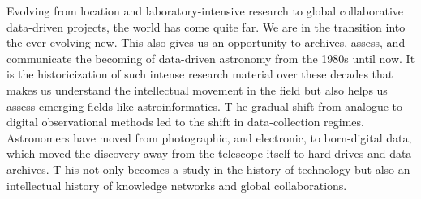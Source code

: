 Evolving from location and laboratory-intensive research to global collaborative data-driven projects, the world has come quite far.  We are in the transition into the ever-evolving new. This also gives us an opportunity to archives, assess, and communicate the becoming of data-driven astronomy from the 1980s until now. It is the historicization of such intense research material over these decades that makes us understand the intellectual movement in the field but also helps us assess emerging fields like astroinformatics.  T
he gradual shift from analogue to digital observational methods led to the shift in data-collection regimes.
Astronomers have moved from photographic, and electronic, to born-digital data, which moved the discovery away from the telescope itself to hard drives and data archives. T
his not only becomes a study in the history of technology but also an intellectual history of knowledge networks and global collaborations.


